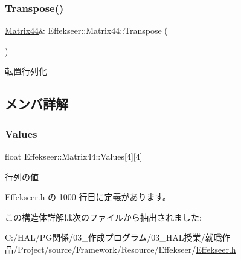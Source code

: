 \subsubsection{\texorpdfstring{Transpose()}{Transpose()}}
{\footnotesize\ttfamily \mbox{\hyperlink{struct_effekseer_1_1_matrix44}{Matrix44}}\& Effekseer\+::\+Matrix44\+::\+Transpose (\begin{DoxyParamCaption}{ }\end{DoxyParamCaption})}



転置行列化 



\subsection{メンバ詳解}
\mbox{\label{struct_effekseer_1_1_matrix44_ac747413302e165521317a399db929313}} 
\subsubsection{\texorpdfstring{Values}{Values}}
{\footnotesize\ttfamily float Effekseer\+::\+Matrix44\+::\+Values\mbox{[}4\mbox{]}\mbox{[}4\mbox{]}}



行列の値 



 Effekseer.\+h の 1000 行目に定義があります。



この構造体詳解は次のファイルから抽出されました\+:\begin{DoxyCompactItemize}
\item 
C\+:/\+H\+A\+L/\+P\+G関係/03\+\_\+作成プログラム/03\+\_\+\+H\+A\+L授業/就職作品/\+Project/source/\+Framework/\+Resource/\+Effekseer/\mbox{\hyperlink{_effekseer_8h}{Effekseer.\+h}}\end{DoxyCompactItemize}
